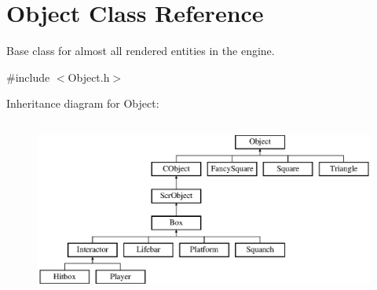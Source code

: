 \hypertarget{class_object}{}\section{Object Class Reference}
\label{class_object}


Base class for almost all rendered entities in the engine.  




{\ttfamily \#include $<$Object.\+h$>$}

Inheritance diagram for Object\+:\begin{figure}[H]
\begin{center}
\leavevmode
\includegraphics[height=5.833333cm]{class_object}
\end{center}
\end{figure}
